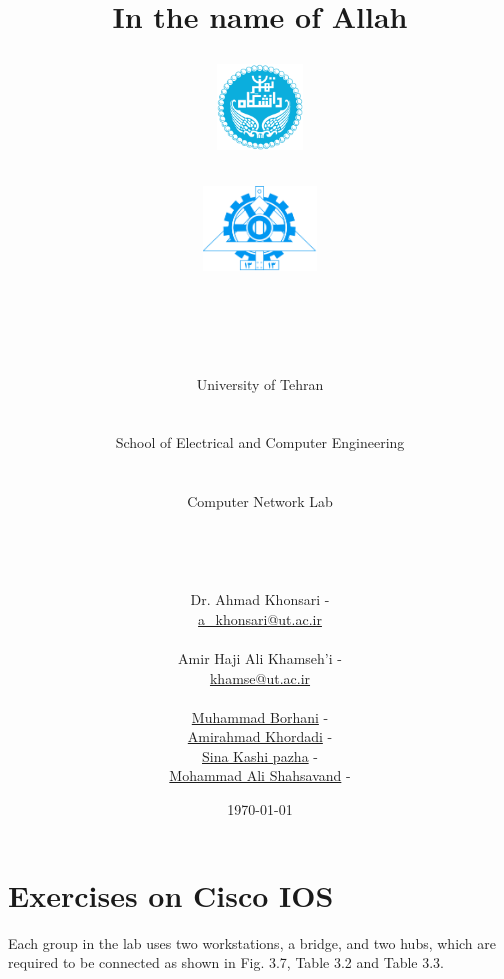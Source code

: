 \documentclass[10pt,a4paper]{article}
\title{
\normalsize In the name of Allah\\
\vspace{10pt}
\LARGE\FR{بسم \allah\  الرحمن الرحیم}
\vspace{10pt}
\begin{center}
    \begin{minipage}{0.48\textwidth}
        \begin{flushleft}
            \includegraphics[height=64pt,width=64pt]{../img/logo.png}
        \end{flushleft}
    \end{minipage}
    \begin{minipage}{0.48\textwidth}
        \begin{flushright}
            \includegraphics[height=64pt]{../img/eng-logo.png}
        \end{flushright}
    \end{minipage}
\end{center}
\vspace*{-64pt}
\huge \titleText\\
\vspace{40pt}
}
\author{
\huge University of Tehran\\
\LARGE \FR{دانشگاه تهران}\\
\\
\LARGE School of Electrical and Computer Engineering\\
\FR{دانشکده مهندسی برق و کامپیوتر}\\
\\
\Large Computer Network Lab\\
\FR{آزمایشگاه شبکه‌های کامپیوتری}\\
\\
\\
\\
\normalfont
Dr. Ahmad Khonsari - \FR{احمد خونساری}\\
\href{mailto:a_khonsari@ut.ac.ir}{a\_khonsari@ut.ac.ir}\\
\\
\normalsize
Amir Haji Ali Khamseh'i - \FR{امیر حاجی علی خمسه‌ء}\\
\href{mailto:khamse@ut.ac.ir}{khamse@ut.ac.ir}\\
\\
\normalsize \href{mailto:m.borhani@ut.ac.ir}{Muhammad Borhani} - \FR{محمد برهانی}\\
\normalsize \href{mailto:a.a.khordadi@ut.ac.ir}{Amirahmad Khordadi} - \FR{امیراحمد خردادی}\\
\normalsize \href{mailto:sina\_kashipazha@ut.ac.ir}{Sina Kashi pazha} - \FR{سینا کاشی پزها}\\
\normalsize \href{mailto:mashahsavand@ut.ac.ir}{Mohammad Ali Shahsavand} - \FR{محمد علی شاهسوند}
}
\date{\vspace{30pt}\today\\\vspace{10pt}{\selectlanguage{farsi}\today}}
\numberwithin{equation}{section}
\numberwithin{figure}{section}
\numberwithin{table}{section}
\begin{document}

    \maketitle


    \pagebreak





\section*{Exercises on Cisco IOS}
    Each group in the lab uses two workstations, a bridge, and two hubs, which are required to be connected as shown in Fig. 3.7, Table 3.2 and Table 3.3.
\end{document}

